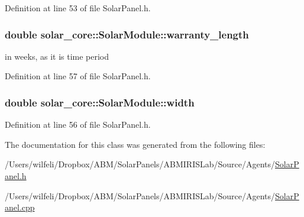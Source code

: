 Definition at line 53 of file Solar\+Panel.\+h.

\hypertarget{classsolar__core_1_1_solar_module_a88f461fc1142688294bf19ca02b7ec0d}{}
\subsubsection[{warranty\+\_\+length}]{\setlength{\rightskip}{0pt plus 5cm}double solar\+\_\+core\+::\+Solar\+Module\+::warranty\+\_\+length}\label{classsolar__core_1_1_solar_module_a88f461fc1142688294bf19ca02b7ec0d}
in weeks, as it is time period 

Definition at line 57 of file Solar\+Panel.\+h.

\hypertarget{classsolar__core_1_1_solar_module_a72b5c417f88deb65818e96b5fcf52ef9}{}
\subsubsection[{width}]{\setlength{\rightskip}{0pt plus 5cm}double solar\+\_\+core\+::\+Solar\+Module\+::width}\label{classsolar__core_1_1_solar_module_a72b5c417f88deb65818e96b5fcf52ef9}


Definition at line 56 of file Solar\+Panel.\+h.



The documentation for this class was generated from the following files\+:\begin{DoxyCompactItemize}
\item 
/\+Users/wilfeli/\+Dropbox/\+A\+B\+M/\+Solar\+Panels/\+A\+B\+M\+I\+R\+I\+S\+Lab/\+Source/\+Agents/\hyperlink{_solar_panel_8h}{Solar\+Panel.\+h}\item 
/\+Users/wilfeli/\+Dropbox/\+A\+B\+M/\+Solar\+Panels/\+A\+B\+M\+I\+R\+I\+S\+Lab/\+Source/\+Agents/\hyperlink{_solar_panel_8cpp}{Solar\+Panel.\+cpp}\end{DoxyCompactItemize}
